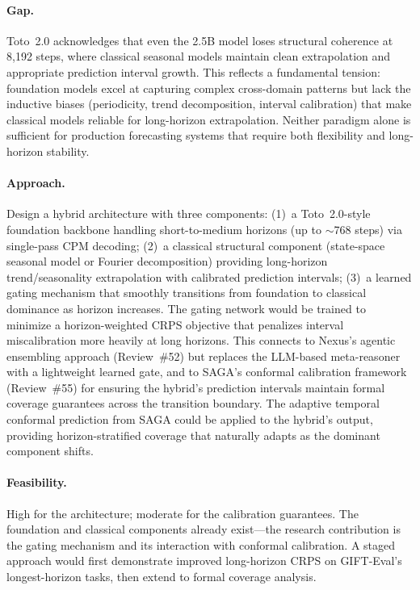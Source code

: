 \documentclass[11pt,a4paper]{article}
\begin{document}
\paragraph{Gap.}
Toto~2.0 acknowledges that even the 2.5B model loses structural coherence at 8,192 steps, where classical seasonal models maintain clean extrapolation and appropriate prediction interval growth. This reflects a fundamental tension: foundation models excel at capturing complex cross-domain patterns but lack the inductive biases (periodicity, trend decomposition, interval calibration) that make classical models reliable for long-horizon extrapolation. Neither paradigm alone is sufficient for production forecasting systems that require both flexibility and long-horizon stability.

\paragraph{Approach.}
Design a hybrid architecture with three components: (1)~a Toto~2.0-style foundation backbone handling short-to-medium horizons (up to $\sim$768 steps) via single-pass CPM decoding; (2)~a classical structural component (state-space seasonal model or Fourier decomposition) providing long-horizon trend/seasonality extrapolation with calibrated prediction intervals; (3)~a learned gating mechanism that smoothly transitions from foundation to classical dominance as horizon increases. The gating network would be trained to minimize a horizon-weighted CRPS objective that penalizes interval miscalibration more heavily at long horizons. This connects to Nexus's agentic ensembling approach (Review~\#52) but replaces the LLM-based meta-reasoner with a lightweight learned gate, and to SAGA's conformal calibration framework (Review~\#55) for ensuring the hybrid's prediction intervals maintain formal coverage guarantees across the transition boundary. The adaptive temporal conformal prediction from SAGA could be applied to the hybrid's output, providing horizon-stratified coverage that naturally adapts as the dominant component shifts.

\paragraph{Feasibility.}
High for the architecture; moderate for the calibration guarantees. The foundation and classical components already exist---the research contribution is the gating mechanism and its interaction with conformal calibration. A staged approach would first demonstrate improved long-horizon CRPS on GIFT-Eval's longest-horizon tasks, then extend to formal coverage analysis.
\end{document}
